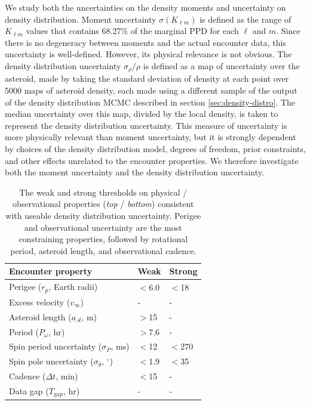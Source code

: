 \documentclass[fleqn,usenatbib]{mnras}
\begin{document}
We study both the uncertainties on the density moments and uncertainty on density distribution. Moment uncertainty $\sigma (K_{\ell m})$ is defined as the range of $K_{\ell m}$ values that contains 68.27\% of the marginal PPD for each $\ell$ and $m$. Since there is no degeneracy between moments and the actual encounter data, this uncertainty is well-defined. However, its physical relevance is not obvious. The density distribution uncertainty $\sigma_\rho / \rho$ is defined as a map of uncertainty over the asteroid, made by taking the standard deviation of density at each point over 5000 maps of asteroid density, each made using a different sample of the output of the density distribution MCMC described in section \ref{sec:density-distro}. The median uncertainty over this map, divided by the local density, is taken to represent the density distribution uncertainty. This measure of uncertainty is more physically relevant than moment uncertainty, but it is strongly dependent by choices of the density distribution model, degrees of freedom, prior constraints, and other effects unrelated to the encounter properties. We therefore investigate both the moment uncertainty and the density distribution uncertainty. 

\begin{table}
  \centering
  \begin{tabular}{lll} \hline
    Encounter property & Weak &Strong \\ \hline
    Perigee ($r_p$, Earth radii) & $<$6.0 & $<$18\\
    Excess velocity ($v_\infty$) & - & - \\
    Asteroid length ($a_\mathcal{A}$, m) & $>$15 & - \\
    Period ($P_\omega$, hr) & $>$7.6 & - \\ \hline
    Spin period uncertainty ($\sigma_P$, ms) & $<$12 & $<$270\\
    Spin pole uncertainty ($\sigma_\theta$, $^\circ$) & $<$1.9 & $<$35 \\
    Cadence ($\Delta t$, min) & $<$15 & - \\
    Data gap ($T_\text{gap}$, hr) & - & - \\ 
    \hline
  \end{tabular}
  \caption{The weak and strong thresholds on physical / observational properties (\textit{top} / \textit{bottom}) consistent with useable density distribution uncertainty. Perigee and observational uncertainty are the most constraining properties, followed by rotational period, asteroid length, and observational cadence.}
  \label{tab:threshold-summary}
\end{table}
\end{document}
